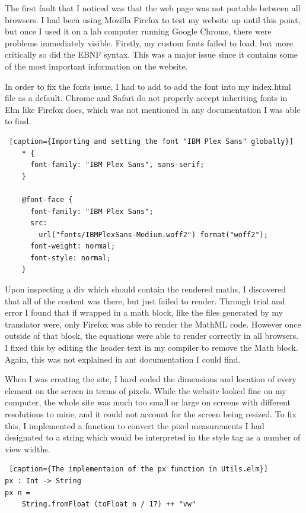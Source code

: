 \documentclass{l4proj}
\begin{document}
The first fault that I noticed was that the web page was not portable between all browsers.  I had been using Mozilla Firefox to test my website up until this point, but once I used it on a lab computer running Google Chrome, there were problems immediately visible.  Firstly, my custom fonts failed to load, but more critically so did the EBNF syntax.  This was a major issue since it contains some of the most important information on the website.

In order to fix the fonts issue, I had to add to add the font into my index.html file as a default.  Chrome and Safari do not properly accept inheriting fonts in Elm like Firefox does, which was not mentioned in any documentation I was able to find.

\begin{lstlisting} [caption={Importing and setting the font "IBM Plex Sans" globally}]
    * {
      font-family: "IBM Plex Sans", sans-serif;
    }
    
    @font-face {
      font-family: "IBM Plex Sans";
      src:
        url("fonts/IBMPlexSans-Medium.woff2") format("woff2");
      font-weight: normal;
      font-style: normal;
    }
\end{lstlisting}

Upon inspecting a div which should contain the rendered maths, I discovered that all of the content was there, but just failed to render.  Through trial and error I found that if wrapped in a math block, like the files generated by my translator were, only Firefox was able to render the MathML code.  However once outside of that block, the equations were able to render correctly in all browsers.  I fixed this by editing the header text in my compiler to remove the Math block.  Again, this was not explained in ant documentation I could find.

When I was creating the site, I hard coded the dimensions and location of every element on the screen in terms of pixels.  While the website looked fine on my computer, the whole site was much too small or large on screens with different resolutions to mine, and it could not account for the screen being resized.  To fix this, I implemented a function to convert the pixel measurements I had designated to a string which would be interpreted in the style tag as a number of view widths.

\begin{lstlisting} [caption={The implementaion of the px function in Utils.elm}]
px : Int -> String
px n =
    String.fromFloat (toFloat n / 17) ++ "vw"
\end{lstlisting}
\end{document}
